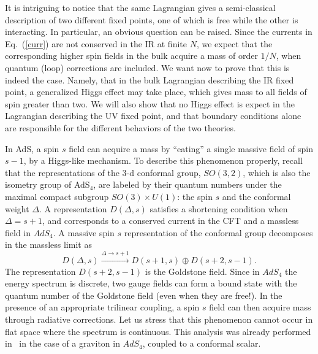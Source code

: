 \documentclass[a4paper,12pt]{article}
\begin{document}
It is intriguing to notice that the same Lagrangian gives a
semi-classical description of two different fixed points, one of which
is free while the other is interacting. In particular, an obvious
question can be raised.  Since the currents in Eq.~(\ref{curr}) are
not conserved in the IR at finite $N$, we expect that the
corresponding higher spin fields in the bulk acquire a mass of order
$1/N$, when quantum (loop) corrections are included.  We want now to
prove that this is indeed the case. Namely, that in the bulk
Lagrangian describing the IR fixed point, a generalized Higgs effect
may take place, which gives mass to all fields of spin greater than
two.  We will also show that no Higgs effect is expect in the
Lagrangian describing the UV fixed point, and that boundary conditions
alone are responsible for the different behaviors of the two theories.

In AdS, a spin $s$ field can acquire a mass by ``eating'' a single
massive field of spin $s-1$, by a Higgs-like mechanism.  To describe
this phenomenon properly, recall that the representations of the 3-d
conformal group, $SO(3,2)$, which is also the isometry group of
AdS$_4$, are labeled by their quantum numbers under the maximal
compact subgroup $SO(3)\times U(1)$: the spin $s$ and the conformal
weight $\Delta$. A representation $D(\Delta,s)$ satisfies a shortening
condition when $\Delta =s+1$, and corresponds to a conserved current
in the CFT and a massless field in $AdS_4$.  A massive spin $s$
representation of the conformal group decomposes in the massless limit
as~\cite{he}
\begin{equation}
 D(\Delta,s)\xrightarrow{\Delta\rightarrow s+1} D(s+1,s)\oplus
 D(s+2,s-1) .
\end{equation}
The representation $D(s+2,s-1)$ is the Goldstone field.
Since in $AdS_4$ the energy
spectrum is discrete, two gauge fields can form a bound state with
the quantum number of the Goldstone field (even when they are free!). 
In the presence of an appropriate trilinear coupling,
a spin $s$ field can then acquire mass through radiative corrections.
Let us stress that this phenomenon cannot occur in flat space where
the spectrum is continuous.
This analysis was already performed in~\cite{porrati} in the case of a
graviton in $AdS_4$, coupled to a conformal scalar. 
\end{document}
